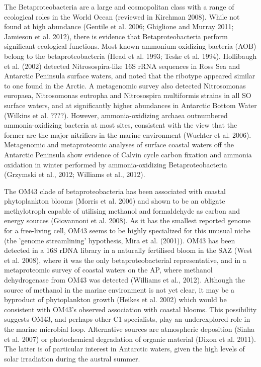 The Betaproteobacteria are a large and cosmopolitan class with a range of ecological roles in the World Ocean (reviewed in Kirchman 2008). While not found at high abundance (Gentile et al. 2006; Ghiglione and Murray 2011; Jamieson et al. 2012), there is evidence that Betaproteobacteria perform significant ecological functions. Most known ammonium oxidizing bacteria (AOB) belong to the betaproteobacteria (Head et al. 1993; Teske et al. 1994). Hollibaugh et al. (2002) detected Nitrosospira-like 16S rRNA sequences in Ross Sea and Antarctic Peninsula surface waters, and noted that the ribotype appeared similar to one found in the Arctic. A metagenomic survey also detected Nitrosomonas europaea, Nitrosomonas eutropha and Nitrosospira multiformis strains in all SO surface waters, and at significantly higher abundances in Antarctic Bottom Water (Wilkins et al. ????). However, ammonia-oxidizing archaea outnumbered ammonia-oxidizing bacteria at most sites, consistent with the view that the former are the major nitrifiers in the marine environment (Wuchter et al. 2006). Metagenomic and metaproteomic analyses of surface coastal waters off the Antarctic Peninsula show evidence of Calvin cycle carbon fixation and ammonia oxidation in winter performed by ammonia-oxidizing Betaproteobacteria (Grzymski et al., 2012; Williams et al., 2012).

The OM43 clade of betaproteobacteria has been associated with coastal phytoplankton blooms (Morris et al. 2006) and shown to be an obligate methylotroph capable of utilising methanol and formaldehyde as carbon and energy sources (Giovannoni et al. 2008). As it has the smallest reported genome for a free-living cell, OM43 seems to be highly specialized for this unusual niche (the 'genome streamlining' hypothesis, Mira et al. (2001)). OM43 has been detected in a 16S rDNA library in a naturally fertilised bloom in the SAZ (West et al. 2008), where it was the only betaproteobacterial representative, and in a metaproteomic survey of coastal waters on the AP, where methanol dehydrogenase from OM43 was detected (Williams et al., 2012). Although the source of methanol in the marine environment is not yet clear, it may be a byproduct of phytoplankton growth (Heikes et al. 2002) which would be consistent with OM43's observed association with coastal blooms. This possibility suggests OM43, and perhaps other C1 specialists, play an underexplored role in the marine microbial loop. Alternative sources are atmospheric deposition (Sinha et al. 2007) or photochemical degradation of organic material (Dixon et al. 2011). The latter is of particular interest in Antarctic waters, given the high levels of solar irradiation during the austral summer.

